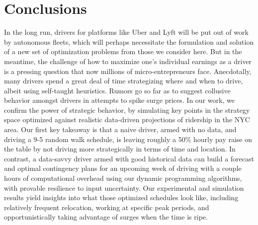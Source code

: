 
\section{Conclusions}
\label{sec:conclusions}

In the long run, drivers for platforms like Uber and Lyft will be put 
out of work by autonomous fleets, which will perhaps necessitate the 
formulation and solution of a new set of optimization problems from those 
we consider here.  But in the meantime, the challenge of how to maximize 
one's individual earnings as a driver is a pressing question that now
millions of micro-entrepreneurs face.  Anecdotally, many drivers spend a 
great deal of time strategizing where and when to drive, albeit using 
self-taught heuristics. Rumors go so far as to suggest collusive behavior 
amongst drivers in attempts to spike surge prices.
In our work, we confirm the power of strategic behavior, by simulating 
key points in the strategy space optimized against realistic data-driven projections
of ridership in the NYC area.  Our first key takeaway is that a naive driver,
armed with no data, and driving a 9-5 random walk schedule, is leaving 
roughly a 50\% hourly pay raise on the table by not driving more strategically 
in terms of time and location.  In contrast, a data-savvy driver armed with
good historical data can build a forecast and optimal contingency plans for 
an upcoming week of driving with a couple hours of computational overhead using 
our dynamic programming algorithms, with provable resilience to input
uncertainty.  Our experimental and simulation results yield insights into what
those optimized schedules look like, including relatively frequent relocation,
working at specific peak periods, and opportunistically taking advantage of 
surges when the time is ripe.



